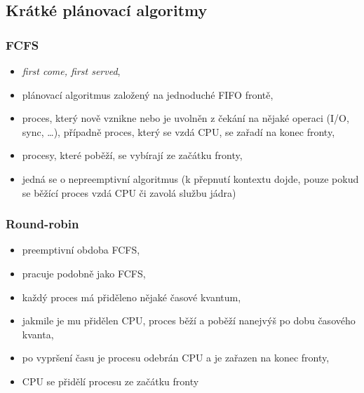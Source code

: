 \documentclass[a4paper, 11pt]{article}
\begin{document}
\subsection{Krátké plánovací algoritmy}
\subsubsection{FCFS}
\begin{itemize}
    \item \emph{first come, first served},
    \item plánovací algoritmus založený na jednoduché FIFO frontě,
    \item proces, který nově vznikne nebo je uvolněn z čekání na nějaké operaci (I/O, sync, \ldots), případně proces, který se vzdá CPU, se zařadí na konec fronty,
    \item procesy, které poběží, se vybírají ze začátku fronty,
    \item jedná se o nepreemptivní algoritmus (k přepnutí kontextu dojde, pouze pokud se běžící proces vzdá CPU či zavolá službu jádra)
\end{itemize}
 
\subsubsection{Round-robin}
\begin{itemize}
    \item preemptivní obdoba FCFS,
    \item pracuje podobně jako FCFS,
    \item každý proces má přiděleno nějaké časové kvantum,
    \item jakmile je mu přidělen CPU, proces běží a poběží nanejvýš po dobu časového kvanta,
    \item po vypršení času je procesu odebrán CPU a je zařazen na konec fronty,
    \item CPU se přidělí procesu ze začátku fronty
\end{itemize}
 
\end{document}
